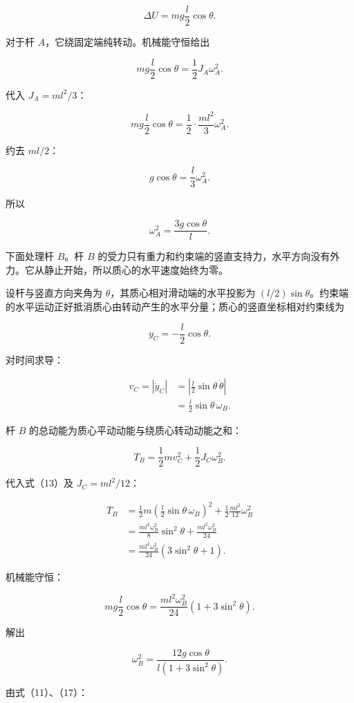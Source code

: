 \documentclass[12pt,a4paper,UTF8]{ctexart}
\begin{document}
\[
\Delta U=mg\frac l2\cos\theta. \tag{7}
\]

对于杆 \(A\)，它绕固定端纯转动。机械能守恒给出

\[
mg\frac l2\cos\theta
=\frac12J_A\omega_A^2. \tag{8}
\]

代入 \(J_A=ml^2/3\)：

\[
mg\frac l2\cos\theta
=\frac12\cdot\frac{ml^2}{3}\omega_A^2. \tag{9}
\]

约去 \(ml/2\)：

\[
g\cos\theta=\frac l3\omega_A^2. \tag{10}
\]

所以

\[
\omega_A^2=\frac{3g\cos\theta}{l}. \tag{11}
\]

下面处理杆 \(B\)。杆 \(B\)
的受力只有重力和约束端的竖直支持力，水平方向没有外力。它从静止开始，所以质心的水平速度始终为零。

设杆与竖直方向夹角为 \(\theta\)，其质心相对滑动端的水平投影为
\((l/2)\sin\theta\)。约束端的水平运动正好抵消质心由转动产生的水平分量；质心的竖直坐标相对约束线为

\[
y_C=-\frac l2\cos\theta. \tag{12}
\]

对时间求导：

\[
\begin{aligned}
v_C
=|\dot y_C|
&=\left|\frac l2\sin\theta\,\dot\theta\right|\\
&=\frac l2\sin\theta\,\omega_B.
\end{aligned} \tag{13}
\]

杆 \(B\) 的总动能为质心平动动能与绕质心转动动能之和：

\[
T_B=\frac12mv_C^2+\frac12J_C\omega_B^2. \tag{14}
\]

代入式（13）及 \(J_C=ml^2/12\)：

\[
\begin{aligned}
T_B
&=\frac12m\left(\frac l2\sin\theta\,\omega_B\right)^2
+\frac12\frac{ml^2}{12}\omega_B^2\\
&=\frac{ml^2\omega_B^2}{8}\sin^2\theta
+\frac{ml^2\omega_B^2}{24}\\
&=\frac{ml^2\omega_B^2}{24}
(3\sin^2\theta+1).
\end{aligned} \tag{15}
\]

机械能守恒：

\[
mg\frac l2\cos\theta
=\frac{ml^2\omega_B^2}{24}
(1+3\sin^2\theta). \tag{16}
\]

解出

\[
\omega_B^2
=\frac{12g\cos\theta}{l(1+3\sin^2\theta)}. \tag{17}
\]

由式（11）、（17）：
\end{document}
